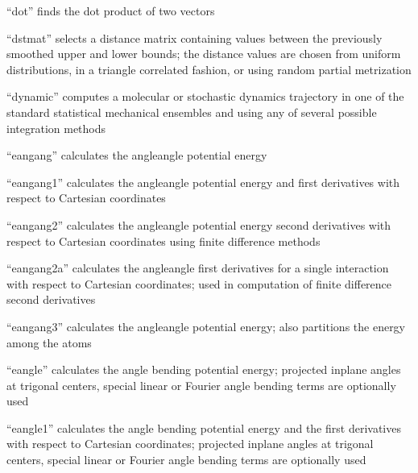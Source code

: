 \documentclass[letterpaper,11pt,english]{sphinxmanual}
\begin{document}

“dot” finds the dot product of two vectors


“dstmat” selects a distance matrix containing values between
the previously smoothed upper and lower bounds; the distance
values are chosen from uniform distributions, in a triangle
correlated fashion, or using random partial metrization


“dynamic” computes a molecular or stochastic dynamics trajectory
in one of the standard statistical mechanical ensembles and using
any of several possible integration methods


“eangang” calculates the angle\sphinxhyphen{}angle potential energy


“eangang1” calculates the angle\sphinxhyphen{}angle potential energy and
first derivatives with respect to Cartesian coordinates


“eangang2” calculates the angle\sphinxhyphen{}angle potential energy
second derivatives with respect to Cartesian coordinates
using finite difference methods


“eangang2a” calculates the angle\sphinxhyphen{}angle first derivatives for
a single interaction with respect to Cartesian coordinates;
used in computation of finite difference second derivatives


“eangang3” calculates the angle\sphinxhyphen{}angle potential energy;
also partitions the energy among the atoms


“eangle” calculates the angle bending potential energy;
projected in\sphinxhyphen{}plane angles at trigonal centers, special
linear or Fourier angle bending terms are optionally used


“eangle1” calculates the angle bending potential energy and
the first derivatives with respect to Cartesian coordinates;
projected in\sphinxhyphen{}plane angles at trigonal centers, special linear
or Fourier angle bending terms are optionally used
\end{document}
